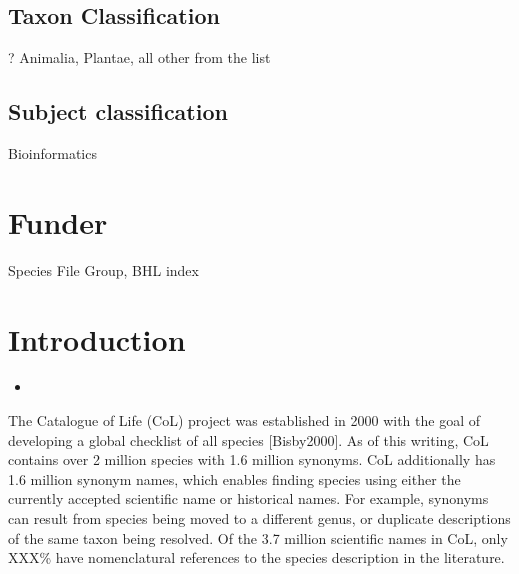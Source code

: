 \documentclass[
]{article}
\providecommand{\tightlist}{%
  \setlength{\itemsep}{0pt}\setlength{\parskip}{0pt}}
\begin{document}
\hypertarget{taxon-classification}{%
\subsection{Taxon Classification}\label{taxon-classification}}

? Animalia, Plantae, all other from the list

\hypertarget{subject-classification}{%
\subsection{Subject classification}\label{subject-classification}}

Bioinformatics

\hypertarget{funder}{%
\section{Funder}\label{funder}}

Species File Group, BHL index

\hypertarget{introduction}{%
\section{Introduction}\label{introduction}}

\begin{itemize}
\item
\end{itemize}

The Catalogue of Life (CoL) project was established in 2000 with the
goal of developing a global checklist of all species {[}Bisby2000{]}. As
of this writing, CoL contains over 2 million species with 1.6 million
synonyms. CoL additionally has 1.6 million synonym names, which enables
finding species using either the currently accepted scientific name or
historical names. For example, synonyms can result from species being
moved to a different genus, or duplicate descriptions of the same taxon
being resolved. Of the 3.7 million scientific names in CoL, only XXX\%
have nomenclatural references to the species description in the
literature.
\end{document}
